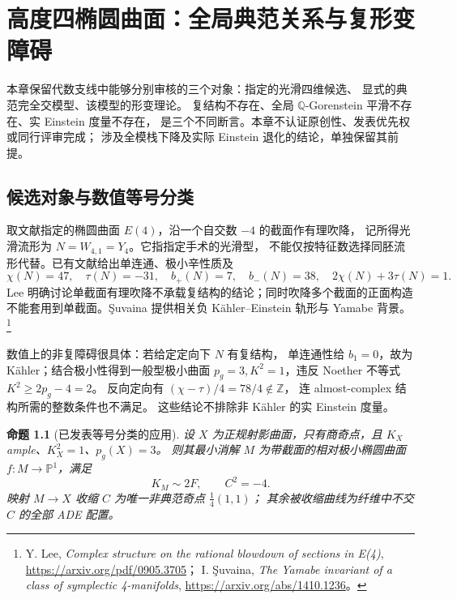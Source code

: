 \documentclass[UTF8,fontset=fandol,zihao=-4,oneside,openany]{ctexbook}
\theoremstyle{cjkplain}
\newtheorem{proposition}[theorem]{命题}
\numberwithin{equation}{chapter}
\begin{document}
\chapter{高度四椭圆曲面：全局典范关系与复形变障碍}
\label{ALG:chapter}

本章保留代数支线中能够分别审核的三个对象：指定的光滑四维候选、
显式的典范完全交模型、该模型的形变理论。
复结构不存在、全局 $\mathbb Q$-Gorenstein 平滑不存在、实 Einstein 度量不存在，
是三个不同断言。本章不认证原创性、发表优先权或同行评审完成；
涉及全模栈下降及实际 Einstein 退化的结论，单独保留其前提。

\section{候选对象与数值等号分类}

取文献指定的椭圆曲面 $E(4)$，沿一个自交数 $-4$ 的截面作有理吹降，
记所得光滑流形为 $N=W_{4,1}=Y_4$。它指指定手术的光滑型，
不能仅按特征数选择同胚流形代替。已有文献给出单连通、极小辛性质及
\begin{equation}
\chi(N)=47,\quad \tau(N)=-31,\quad b_+(N)=7,\quad b_-(N)=38,\quad
2\chi(N)+3\tau(N)=1.
\label{ALG:topology}
\end{equation}
Lee 明确讨论单截面有理吹降不承载复结构的结论；同时吹降多个截面的正面构造
不能套用到单截面。Şuvaina 提供相关负 Kähler--Einstein 轨形与 Yamabe 背景。
\footnote{Y. Lee, \emph{Complex structure on the rational blowdown of sections in
E(4)}, \url{https://arxiv.org/pdf/0905.3705}；
I. Şuvaina, \emph{The Yamabe invariant of a class of symplectic 4-manifolds},
\url{https://arxiv.org/abs/1410.1236}。}

数值上的非复障碍很具体：若给定定向下 $N$ 有复结构，
单连通性给 $b_1=0$，故为 Kähler；结合极小性得到一般型极小曲面
$p_g=3,K^2=1$，违反 Noether 不等式 $K^2\ge2p_g-4=2$。
反向定向有 $(\chi-\tau)/4=78/4\notin\mathbb Z$，
连 almost-complex 结构所需的整数条件也不满足。
这些结论不排除非 Kähler 的实 Einstein 度量。

\begin{proposition}[已发表等号分类的应用]
\label{ALG:classification}
设 $X$ 为正规射影曲面，只有商奇点，且
$K_X$ ample、$K_X^2=1$、$p_g(X)=3$。
则其最小消解 $M$ 为带截面的相对极小椭圆曲面
$f:M\to\mathbb P^1$，满足
\[
K_M\sim2F,\qquad C^2=-4.
\]
映射 $M\to X$ 收缩 $C$ 为唯一非典范奇点 $\frac14(1,1)$；
其余被收缩曲线为纤维中不交 $C$ 的全部 ADE 配置。
\end{proposition}
\end{document}
